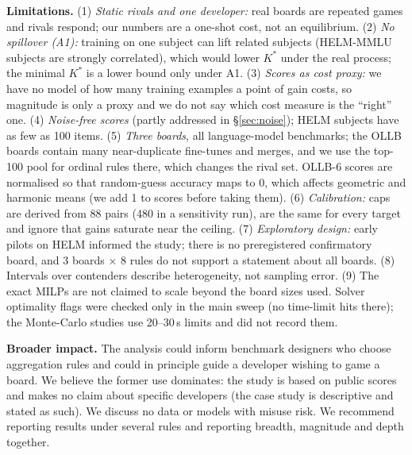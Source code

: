 \documentclass{article}
\theoremstyle{remark}
\begin{document}
\textbf{Limitations.} (1) \emph{Static rivals and one developer:} real boards are repeated games and rivals respond; our numbers are a one-shot cost, not an equilibrium. (2) \emph{No spillover (A1):} training on one subject can lift related subjects (HELM-MMLU subjects are strongly correlated), which would lower $K^\ast$ under the real process; the minimal $K^\ast$ is a lower bound only under A1. (3) \emph{Scores as cost proxy:} we have no model of how many training examples a point of gain costs, so magnitude is only a proxy and we do not say which cost measure is the ``right'' one. (4) \emph{Noise-free scores} (partly addressed in \S\ref{sec:noise}); HELM subjects have as few as 100 items. (5) \emph{Three boards}, all language-model benchmarks; the OLLB boards contain many near-duplicate fine-tunes and merges, and we use the top-100 pool for ordinal rules there, which changes the rival set. OLLB-6 scores are normalised so that random-guess accuracy maps to 0, which affects geometric and harmonic means (we add 1 to scores before taking them). (6) \emph{Calibration:} caps are derived from 88 pairs (480 in a sensitivity run), are the same for every target and ignore that gains saturate near the ceiling. (7) \emph{Exploratory design:} early pilots on HELM informed the study; there is no preregistered confirmatory board, and 3 boards $\times$ 8 rules do not support a statement about all boards. (8) Intervals over contenders describe heterogeneity, not sampling error. (9) The exact MILPs are not claimed to scale beyond the board sizes used. Solver optimality flags were checked only in the main sweep (no time-limit hits there); the Monte-Carlo studies use 20--30\,s limits and did not record them.

\textbf{Broader impact.} The analysis could inform benchmark designers who choose aggregation rules and could in principle guide a developer wishing to game a board. We believe the former use dominates: the study is based on public scores and makes no claim about specific developers (the case study is descriptive and stated as such). We discuss no data or models with misuse risk. We recommend reporting results under several rules and reporting breadth, magnitude and depth together.




\appendix
\end{document}

